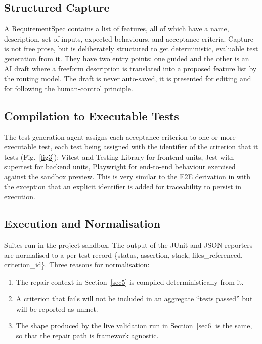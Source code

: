 \documentclass[pdflatex,sn-mathphys-num]{sn-jnl}%
\newcommand{\chg}[1]{{\color{blue}#1}}
\newcommand{\fixdel}[1]{{\color{fixcol}\sout{#1}}}
\theoremstyle{thmstyleone}%
\theoremstyle{thmstyletwo}%
\theoremstyle{thmstylethree}%
\begin{document}
\subsection{Structured Capture}\label{sec4.1}

A RequirementSpec contains a list of features, all of which have a name, description, set of inputs, expected behaviours, and acceptance criteria. Capture is not free prose, but is deliberately structured to get deterministic, evaluable test generation from it. They have two entry points: one guided and the other is an AI draft where a freeform description is translated into a proposed feature list by the routing model. The draft is never auto-saved, it is presented for editing and for following the human-control principle.

\subsection{Compilation to Executable Tests}\label{sec4.2}

The test-generation agent assigns each acceptance criterion to one or more executable test, each test being assigned with the identifier of the criterion that it tests \chg{(Fig.~\ref{fig3})}: Vitest and Testing Library for frontend units, Jest with supertest for backend units, Playwright for end-to-end behaviour exercised against the sandbox preview. This is very similar to the E2E derivation in \cite{r18alian} with the exception that an explicit identifier is added for traceability to persist in execution.%

\subsection{Execution and Normalisation}\label{sec4.3}

Suites run in the project sandbox. The output of the \fixdel{JUnit and }JSON reporters are normalised to a per-test record \{status, assertion, stack, files\_referenced, criterion\_id\}. Three reasons for normalisation:%

\begin{enumerate}
\item The repair context in Section~\ref{sec5} is compiled deterministically from it.
\item A criterion that fails will not be included in an aggregate ``tests passed'' but will be reported as unmet.
\item The shape produced by the live validation run in Section~\ref{sec6} is the same, so that the repair path is framework agnostic.
\end{enumerate}
\end{document}
